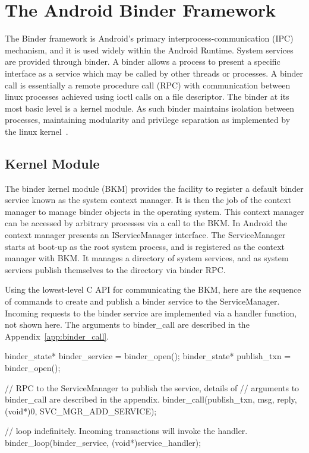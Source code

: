 \documentclass[prodmode]{acmlarge}
\begin{document}
\section{The Android Binder Framework}
\label{sec:AndroidBinderFramework}
The Binder framework is Android's primary interprocess-communication (IPC) mechanism, and it is used widely within the Android Runtime. System services are provided through binder.
A binder allows a process to present a specific interface as a service which may be called by other threads or processes. A binder call is essentially a remote procedure call (RPC) with communication between linux processes achieved using ioctl calls on a file descriptor. The binder at its most basic level is a kernel module. As such binder maintains isolation between processes, maintaining modularity and privilege separation as implemented by the linux kernel~\cite{OpenBinder}.

\subsection{Kernel Module}
The binder kernel module (BKM) provides the facility to register a default binder service known as the system context manager. It is then the job of the context manager to manage binder objects in the operating system. This context manager can be accessed by arbitrary processes via a call to the BKM. In Android the context manager presents an IServiceManager interface. The ServiceManager starts at boot-up as the root system process, and is registered as the context manager with BKM. It manages a directory of system services, and as system services publish themselves to the directory via binder RPC.

Using the lowest-level C API for communicating the BKM, here are the sequence of commands to create and publish a binder service to the ServiceManager. Incoming requests to the binder service are implemented via a handler function, not shown here. The arguments to binder\_call are described in the Appendix~\ref{app:binder_call}.

\begin{snippet}[label=snip:binder_call,caption=binder\_call to publish a service with ServiceManager]
binder_state* binder_service = binder_open();
binder_state* publish_txn = binder_open();

// RPC to the ServiceManager to publish the  service, details of
// arguments to binder_call  are described in the appendix.
binder_call(publish_txn, msg, reply, (void*)0, SVC_MGR_ADD_SERVICE);

// loop indefinitely. Incoming transactions  will invoke the handler.
binder_loop(binder_service, (void*)service_handler);
\end{snippet}
\end{document}

